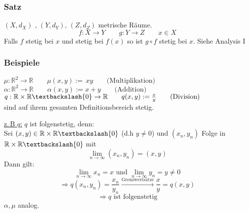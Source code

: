 \subsubsection{Satz} %
\label{ssub:satz}
$(X,d_X)$ , $(Y,d_Y)$, $(Z,d_Z)$ metrische Räume. 
\[ f:X \to Y \qquad g:Y \to Z \qquad x \in X \]
Falls $f$ stetig bei $x$ und stetig bei $f(x)$ so ist $g \circ f$ stetig bei $x$.
 Siehe Analysis I 
\subsubsection{Beispiele} %
\label{ssub:beispiele}
$\mu: \mathbb{R}^2 \to \mathbb{R} \qquad \mu(x,y):= \, xy \qquad \text{(Multiplikation)}$ \\
$\alpha: \mathbb{R}^2 \to \mathbb{R} \qquad \alpha(x,y):=x+y \qquad \text{(Addition)} $ \\
$q:\mathbb{R} \times \mathbb{R} \textbackslash {0} \to \mathbb{R} \qquad q(x,y):= \frac{x}{y} \qquad \text{(Division)}$
\\
sind auf ihrem gesamten Definitionsbereich stetig.

\underline{z.\,B $q$:}
$q$ ist folgenstetig, denn: \\
Sei $(x,y) \in \mathbb{R} \times \mathbb{R} \textbackslash \{0\}$ (d.h $y \neq 0$) und $(x_n,y_n)$ Folge in $\mathbb{R} \times \mathbb{R} \textbackslash \{0\}$ mit 
\[
	\lim_{n \to \infty}(x_n,y_n)=(x,y)
\]
Dann gilt: 
\[
	\lim_{n \to \infty}x_n=x \text{ und } \lim_{n \to \infty}y_n=y \neq 0
\]
\[
	\Rightarrow q(x_n,y_n)= \frac{x_n}{y_n} \stackrel{\text{Grenzwertsätze}}{\longrightarrow } \frac{x}{y} = q(x,y)
\]
\[
	\Rightarrow q \text{ ist folgenstetig}
\]
$\alpha, \mu$ analog.
\bewende

